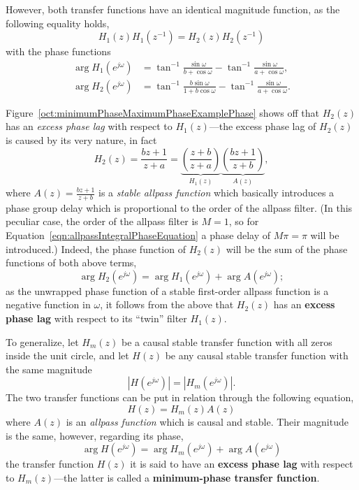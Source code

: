\documentclass[\documentfontsize, twocolumn]{\classname}
\begin{document}
However, both transfer functions have an identical magnitude function, as the following equality holds,
\[
    H_1(z)H_1(z^{-1}) = H_2(z)H_2(z^{-1})
\]
with the phase functions
\begin{align*}
    \arg{H_1(e^{j\omega})} &= \tan^{-1}\frac{\sin \omega}{b + \cos \omega} - \tan^{-1} \frac{\sin \omega}{a + \cos \omega},\\
    \arg{H_2(e^{j\omega})} &= \tan^{-1}\frac{b\sin \omega}{1 + b\cos \omega} - \tan^{-1} \frac{\sin \omega}{a + \cos \omega}.
\end{align*}

\begin{figure*}[ht]
\begin{center}
\scalebox{0.45}{
    
}\caption{Unwrapped phase responses of transfer functions $H_1(z)$ and $H_2(z)$ for values of $a = 0.8$ and $b = -0.5$.}\label{oct:minimumPhaseMaximumPhaseExamplePhase}
\end{center}
\end{figure*}

Figure~\ref{oct:minimumPhaseMaximumPhaseExamplePhase} shows off that $H_2(z)$ has an \emph{excess phase lag} with respect to $H_1(z)$---the excess phase lag of $H_2(z)$ is caused by its very nature, in fact
\[
    H_2(z) = \frac{bz + 1}{z + a} = \underbrace{\left(\frac{z + b}{z + a}\right)}_{H_1(z)}\underbrace{\left(\frac{bz + 1}{z + b}\right)}_{A(z)},
\]
where $A(z) = \frac{bz + 1}{z + b}$ is a \emph{stable allpass function} which basically introduces a phase group delay which is proportional to the order of the allpass filter. (In this peculiar case, the order of the allpass filter is $M=1$, so for Equation~\ref{eqn:allpassIntegralPhaseEquation} a phase delay of $M\pi = \pi$ will be introduced.) Indeed, the phase function of $H_2(z)$ will be the sum of the phase functions of both above terms,
\[
    \arg{H_2(e^{j\omega})} = \arg{H_1(e^{j\omega})} + \arg{A(e^{j\omega})};
\]
as the unwrapped phase function of a stable first-order allpass function is a negative function in $\omega$, it follows from the above that $H_2(z)$ has an \textbf{excess phase lag} with respect to its ``twin'' filter $H_1(z)$.

To generalize, let $H_m(z)$ be a causal stable transfer function with all zeros inside the unit circle, and let $H(z)$ be any causal stable transfer function with the same magnitude
\[
    \left|H(e^{j\omega})\right| = \left|H_m(e^{j\omega})\right|.
\]
The two transfer functions can be put in relation through the following equation,
\begin{equation}\label{eqn:minimumPhaseMaximumPhaseRelation}
    H(z) = H_m(z)A(z)
\end{equation}
where $A(z)$ is an \emph{allpass function} which is causal and stable. Their magnitude is the same, however, regarding its phase,
\begin{equation}\label{eqn:minimumPhaseMaximumPhaseExcessPhase}
    \arg{H(e^{j\omega})} = \arg{H_m(e^{j\omega})} + \arg{A(e^{j\omega})}
\end{equation}
the transfer function $H(z)$ it is said to have an \textbf{excess phase lag} with respect to $H_m(z)$---the latter is called a \textbf{minimum-phase transfer function}.
\end{document}
